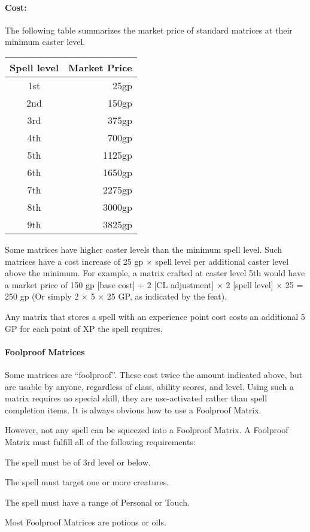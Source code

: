 \paragraph{Cost:} The following table summarizes the market price of standard matrices at their minimum caster level.
\begin{center}
\begin{tabular}{|c|r|}
\hline
\textbf{Spell level}&\textbf{Market Price}\\
\hline
1st&	25gp	\\
2nd&	150gp	\\
3rd&	375gp	\\
4th&	700gp	\\
5th&	1125gp	\\
6th&	1650gp	\\
7th&	2275gp	\\
8th&	3000gp	\\
9th&	3825gp	\\
\hline
\end{tabular}
\end{center}
Some matrices have higher caster levels than the minimum spell level. Such matrices have a cost increase of 25 gp $\times$ spell level per additional caster level above the minimum. For example, a  matrix crafted at caster level 5th would have a market price of 150 gp [base cost] + 2 [CL adjustment] $\times$ 2 [spell level] $\times$ 25 = 250 gp (Or simply 2 $\times$ 5 $\times$ 25 GP, as indicated by the  feat).

Any matrix that stores a spell with an experience point cost costs an additional 5 GP for each point of XP the spell requires.
\paragraph{Foolproof Matrices}
\label{Item:FoolproofMatrices}
Some matrices are ``foolproof''. These cost twice the amount indicated above, but are usable by anyone, regardless of class, ability scores, and level.
Using such a matrix requires no special skill, they are use-activated rather than spell completion items.
It is always obvious how to use a Foolproof Matrix.

However, not any spell can be squeezed into a Foolproof Matrix. A Foolproof Matrix must fulfill all of the following requirements:
\begin{list}{}{\leftmargin=1em}
 \item The spell must be of 3rd level or below.
 \item The spell must target one or more creatures.
 \item The spell must have a range of Personal or Touch.
\end{list}
Most Foolproof Matrices are potions or oils.

